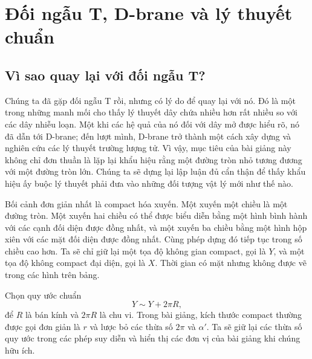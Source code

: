 \chapter{Đối ngẫu T, D-brane và lý thuyết chuẩn}


\section{Vì sao quay lại với đối ngẫu T?}

Chúng ta đã gặp đối ngẫu T rồi, nhưng có lý do để quay lại với nó. Đó là một trong những manh mối cho thấy lý thuyết dây chứa nhiều hơn rất nhiều so với các dây nhiễu loạn. Một khi các hệ quả của nó đối với dây mở được hiểu rõ, nó đã dẫn tới D-brane; đến lượt mình, D-brane trở thành một cách xây dựng và nghiên cứu các lý thuyết trường lượng tử. Vì vậy, mục tiêu của bài giảng này không chỉ đơn thuần là lặp lại khẩu hiệu rằng một đường tròn nhỏ tương đương với một đường tròn lớn. Chúng ta sẽ dựng lại lập luận đủ cẩn thận để thấy khẩu hiệu ấy buộc lý thuyết phải đưa vào những đối tượng vật lý mới như thế nào.

Bối cảnh đơn giản nhất là compact hóa xuyến. Một xuyến một chiều là một đường tròn. Một xuyến hai chiều có thể được biểu diễn bằng một hình bình hành với các cạnh đối diện được đồng nhất, và một xuyến ba chiều bằng một hình hộp xiên với các mặt đối diện được đồng nhất. Cùng phép dựng đó tiếp tục trong số chiều cao hơn. Ta sẽ chỉ giữ lại một tọa độ không gian compact, gọi là \(Y\), và một tọa độ không compact đại diện, gọi là \(X\). Thời gian có mặt nhưng không được vẽ trong các hình trên bảng.

Chọn quy ước chuẩn
\begin{equation}
  Y\sim Y+2\pi R,
  \label{eq:l10-circle-identification}
\end{equation}
để \(R\) là bán kính và \(2\pi R\) là chu vi. Trong bài giảng, kích thước compact thường được gọi đơn giản là \(r\) và lược bỏ các thừa số \(2\pi\) và \(\alpha'\). Ta sẽ giữ lại các thừa số quy ước trong các phép suy diễn và hiển thị các đơn vị của bài giảng khi chúng hữu ích.

